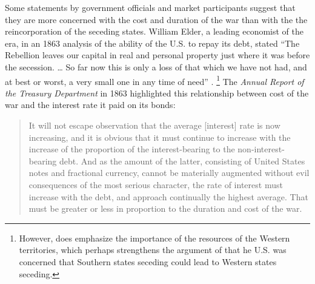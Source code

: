 Some statements by government officials and market participants suggest that they are more concerned with the cost and duration of the war than with the the reincorporation of the seceding states.
William Elder, a leading economist of the era, in an 1863 analysis of the ability of the U.S. to repay its debt, stated ``The Rebellion leaves our capital in real and personal property just where it was before the secession. \dots{} So far now this is only a loss of that which we have not had, and at best or worst, a very small one in any time of need'' \parencite[19]{Elder1863}.%
\footnote{
  However, \textcite{Elder1863} does emphasize the importance of the resources of the Western territories, which perhaps strengthens the argument of  \textcite{Weingast1998} that he U.S. was concerned that Southern states seceding could lead to Western states seceding.
}
The \textit{Annual Report of the Treasury Department} in 1863 highlighted this relationship between cost of the war and the interest rate it paid on its bonds:
\begin{quote}
It will not escape observation that the average [interest] rate is now increasing, and it is obvious that it must continue to increase with the increase of the proportion of the interest-bearing to the non-interest-bearing debt.
And as the amount of the latter, consisting of United States notes and fractional currency, cannot be materially augmented without evil consequences of the most serious character, the rate of interest must increase with the debt, and approach continually the highest average.
That must be greater or less in proportion to the duration and cost of the war. \parencite[13]{Treasury1863}
\end{quote}

